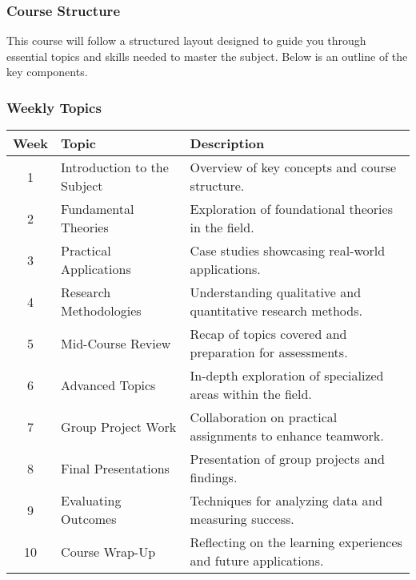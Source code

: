 \documentclass[aspectratio=169]{beamer}
\begin{document}
\begin{frame}[fragile]
    \frametitle{Course Structure}
    This course will follow a structured layout designed to guide you through essential topics and skills needed to master the subject. Below is an outline of the key components.
\end{frame}

\begin{frame}[fragile]
    \frametitle{Weekly Topics}
    \begin{table}[ht]
        \centering
        \begin{tabular}{|c|l|p{6cm}|}
            \hline
            \textbf{Week} & \textbf{Topic} & \textbf{Description} \\ 
            \hline
            1 & Introduction to the Subject & Overview of key concepts and course structure. \\ 
            \hline
            2 & Fundamental Theories & Exploration of foundational theories in the field. \\ 
            \hline
            3 & Practical Applications & Case studies showcasing real-world applications. \\ 
            \hline
            4 & Research Methodologies & Understanding qualitative and quantitative research methods. \\ 
            \hline
            5 & Mid-Course Review & Recap of topics covered and preparation for assessments. \\ 
            \hline
            6 & Advanced Topics & In-depth exploration of specialized areas within the field. \\ 
            \hline
            7 & Group Project Work & Collaboration on practical assignments to enhance teamwork. \\ 
            \hline
            8 & Final Presentations & Presentation of group projects and findings. \\ 
            \hline
            9 & Evaluating Outcomes & Techniques for analyzing data and measuring success. \\ 
            \hline
            10 & Course Wrap-Up & Reflecting on the learning experiences and future applications. \\ 
            \hline
        \end{tabular}
    \end{table}
\end{frame}
\end{document}
